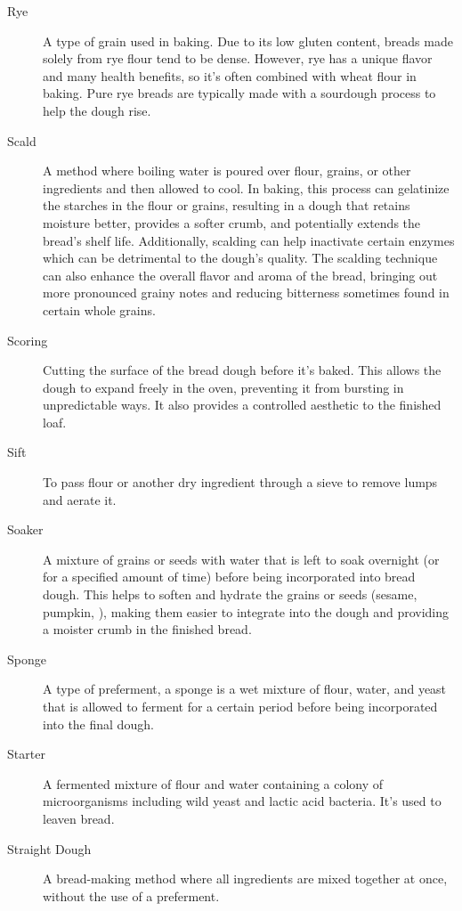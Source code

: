 \begin{description}
\item[Rye] A type of grain used in baking. Due to its low gluten content, breads
made solely from rye flour tend to be dense. However, rye has a unique flavor and
many health benefits, so it's often combined with wheat flour in baking. Pure rye
breads are typically made with a sourdough process to help the dough rise.

\item[Scald] A method where boiling water is poured over flour, grains, or other
ingredients and then allowed to cool. In baking, this process can gelatinize the
starches in the flour or grains, resulting in a dough that retains moisture better,
provides a softer crumb, and potentially extends the bread's shelf life. Additionally,
scalding can help inactivate certain enzymes which can be detrimental to the dough's
quality. The scalding technique can also enhance the overall flavor and aroma of
the bread, bringing out more pronounced grainy notes and reducing bitterness
sometimes found in certain whole grains.

\item[Scoring] Cutting the surface of the bread dough before it's baked. This
allows the dough to expand freely in the oven, preventing it from bursting in
unpredictable ways. It also provides a controlled aesthetic to the finished loaf.

\item[Sift] To pass flour or another dry ingredient through a sieve to
    remove lumps and aerate it.

\item[Soaker] A mixture of grains or seeds with water that is left to soak overnight (or for a
specified amount of time) before being incorporated into bread dough. This helps to
soften and hydrate the grains or seeds (sesame, pumpkin, \etc{}), making them
easier to integrate into the dough and
providing a moister crumb in the finished bread.

\item[Sponge] A type of preferment, a sponge is a wet mixture of flour, water, and
yeast that is allowed to ferment for a certain period before being incorporated into
the final dough.

\item[Starter] A fermented mixture of flour and water containing a colony of
microorganisms including wild yeast and lactic acid bacteria. It's used to leaven
bread.

\item[Straight Dough] A bread-making method where all ingredients are mixed
together at once, without the use of a preferment.


\end{description}
